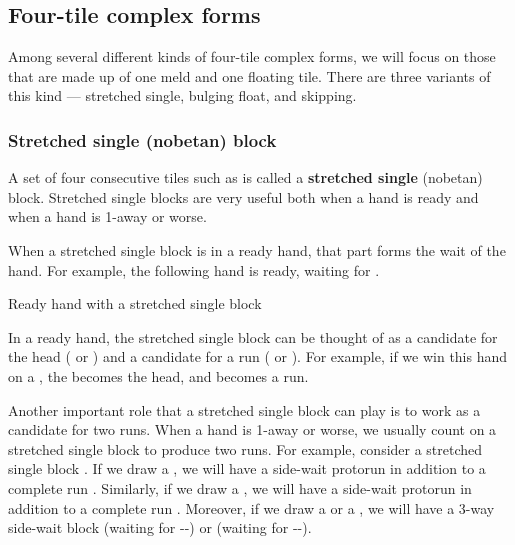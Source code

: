 \subsection{Four-tile complex forms} 
Among several different kinds of four-tile complex forms, we will focus on those that are made up of one meld and one floating tile. There are three variants of this kind --- stretched single, bulging float, and skipping. 

\subsubsection{Stretched single ({\jap nobetan}) block} \label{sec:nobetan}
A set of four consecutive tiles such as {\large{}} is called a {\bf stretched single} ({\jap nobetan}) block. Stretched single blocks are very useful both when a hand is ready and when a hand is 1-away or worse. 

\bigskip
When a stretched single block is in a ready hand, that part forms the wait of the hand. For example, the following hand is ready, waiting for {\large{} }.
\bigskip
\begin{itembox}[r]{Ready hand with a stretched single block}
\bp
{}\zhong\zhong\zhong
\ep 
\end{itembox}
In a ready hand, the stretched single block can be thought of as a candidate for the head ({\large{}} or {\large{}}) and a candidate for a run ({\large{}} or {\large{}}). For example, if we win this hand on a {\large{}}, the {\large{}} becomes the head, and {\large{}} becomes a run. 

\bigskip

Another important role that a stretched single block can play is to work as a candidate for two runs. When a hand is 1-away or worse, we usually count on a stretched single block to produce two runs. 
For example, consider a stretched single block {\large{}}. 
If we draw a {\large{}}, we will have a side-wait protorun {\large{}} in addition to a complete run {\large{}}. Similarly, if we draw a {\large{}}, we will have a side-wait protorun {\large{}} in addition to a complete run {\large{}}. Moreover, if we draw a {\large{}} or a {\large{}}, we will have a 3-way side-wait block {\large{}} (waiting for {\large{}--}) or {\large{}} (waiting for {\large{}--}). 

